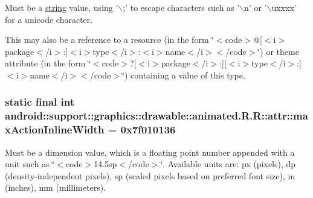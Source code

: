 Must be a \hyperlink{classandroid_1_1support_1_1graphics_1_1drawable_1_1animated_1_1_r_1_1string}{string} value, using '$\backslash$;' to escape characters such as '$\backslash$n' or '$\backslash$uxxxx' for a unicode character. 

This may also be a reference to a resource (in the form \char`\"{}$<$code$>$@\mbox{[}$<$i$>$package$<$/i$>$:\mbox{]}$<$i$>$type$<$/i$>$:$<$i$>$name$<$/i$>$$<$/code$>$\char`\"{}) or theme attribute (in the form \char`\"{}$<$code$>$?\mbox{[}$<$i$>$package$<$/i$>$:\mbox{]}\mbox{[}$<$i$>$type$<$/i$>$:\mbox{]}$<$i$>$name$<$/i$>$$<$/code$>$\char`\"{}) containing a value of this type. \hypertarget{classandroid_1_1support_1_1graphics_1_1drawable_1_1animated_1_1_r_1_1attr_121d77b74b7427e1ce43a4c64f4331a2}{
\subsubsection[{maxActionInlineWidth}]{\setlength{\rightskip}{0pt plus 5cm}static final int android::support::graphics::drawable::animated.R.R::attr::maxActionInlineWidth = 0x7f010136}}
\label{classandroid_1_1support_1_1graphics_1_1drawable_1_1animated_1_1_r_1_1attr_121d77b74b7427e1ce43a4c64f4331a2}


Must be a dimension value, which is a floating point number appended with a unit such as \char`\"{}$<$code$>$14.5sp$<$/code$>$\char`\"{}. Available units are: px (pixels), dp (density-independent pixels), sp (scaled pixels based on preferred font size), in (inches), mm (millimeters). 

